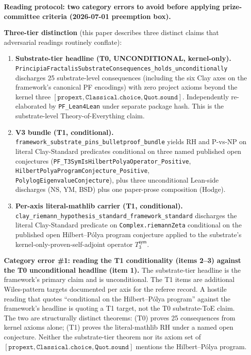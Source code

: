 \documentclass[11pt,a4paper]{amsart}
\theoremstyle{plain}
\theoremstyle{definition}
\begin{document}
\begin{framed}
\noindent\textbf{Reading protocol: two category errors to avoid before applying prize-committee criteria (2026-07-01 preemption box).}

\smallskip
\noindent\textbf{Three-tier distinction} (this paper describes three distinct claims that adversarial readings routinely conflate):

\begin{enumerate}[itemsep=1pt,leftmargin=1.5em]
\item \textbf{Substrate-tier headline (T0, UNCONDITIONAL, kernel-only).} \texttt{PrincipiaFractalisSubstrateConsequences\_holds\_unconditionally} discharges 25 substrate-level consequences (including the six Clay axes on the framework's canonical PF encodings) with zero project axioms beyond the kernel three $[\texttt{propext}, \texttt{Classical.choice}, \texttt{Quot.sound}]$. Independently re-elaborated by \texttt{PF\_Lean4Lean} under separate package hash. This is the substrate-level Theory-of-Everything claim.
\item \textbf{V3 bundle (T1, conditional).} \texttt{framework\_substrate\_pins\_bulletproof\_bundle} yields RH and P-vs-NP on literal Clay-Standard predicates conditional on three named published open conjectures (\texttt{PF\_T3SymIsHilbertPolyaOperator\_Positive}, \texttt{HilbertPolyaProgramConjecture\_Positive}, \texttt{PolylogEigenvalueConjecture}), plus three unconditional Lean-side discharges (NS, YM, BSD) plus one paper-prose composition (Hodge).
\item \textbf{Per-axis literal-mathlib carrier (T1, conditional).} \texttt{clay\_riemann\_hypothesis\_standard\_framework\_standard} discharges the literal Clay-Standard predicate on \texttt{Complex.riemannZeta} conditional on the published open Hilbert--P\'olya program conjecture applied to the substrate's kernel-only-proven-self-adjoint operator $T_3^{\textsf{sym}}$.
\end{enumerate}

\noindent\textbf{Category error \#1: reading the T1 conditionality (items 2--3) against the T0 unconditional headline (item 1).} The substrate-tier headline is the framework's primary claim and is unconditional. The T1 items are additional Wiles-pattern targets documented per axis for the referee record. A hostile reading that quotes ``conditional on the Hilbert--P\'olya program'' against the framework's headline is quoting a T1 target, not the T0 substrate-ToE claim. The two are structurally distinct theorems: (T0) proves 25 consequences from kernel axioms alone; (T1) proves the literal-mathlib RH under a named open conjecture. Neither the substrate-tier theorem nor its axiom set of $[\texttt{propext}, \texttt{Classical.choice}, \texttt{Quot.sound}]$ mentions the Hilbert--P\'olya program.


\end{framed}
\end{document}
